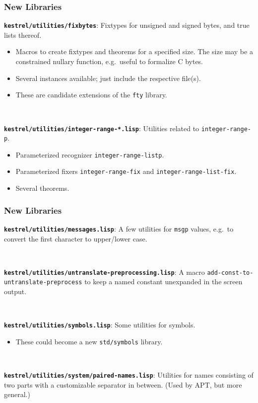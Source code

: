 \documentclass{beamer}
\newcommand{\code}[1]{\texttt{#1}}
\newcommand{\bookpath}[1]{\textbf{\code{#1}}}
\newcommand{\newlibtitle}{\frametitle{New Libraries}}
\begin{document}

\begin{frame}

\newlibtitle

\bookpath{kestrel/utilities/fixbytes}:
Fixtypes for unsigned and signed bytes, and true lists thereof.
\begin{itemize}
\item
Macros to create fixtypes and theorems for a specified size.
The size may be a constrained nullary function,
e.g.\ useful to formalize C bytes.
\item
Several instances available; just include the respective file(s).
\item
These are candidate extensions of the \code{fty} library.
\end{itemize}

\

\bookpath{kestrel/utilities/integer-range-*.lisp}:
Utilities related to \code{integer-range-p}.
\begin{itemize}
\item
Parameterized recognizer \code{integer-range-listp}.
\item
Parameterized fixers
\code{integer-range-fix} and \code{integer-range-list-fix}.
\item
Several theorems.
\end{itemize}

\end{frame}


\begin{frame}

\newlibtitle

\bookpath{kestrel/utilities/messages.lisp}:
A few utilities for \code{msgp} values,
e.g.\ to convert the first character to upper/lower case.

\

\bookpath{kestrel/utilities/untranslate-preprocessing.lisp}:
A macro \code{add-const-to-untranslate-preprocess}
to keep a named constant unexpanded in the screen output.

\

\bookpath{kestrel/utilities/symbols.lisp}:
Some utilities for symbols.
\begin{itemize}
\item
These could become a new \code{std/symbols} library.
\end{itemize}

\

\bookpath{kestrel/utilities/system/paired-names.lisp}:
Utilities for names consisting of
two parts with a customizable separator in between.
(Used by APT, but more general.)

\end{frame}
\end{document}
